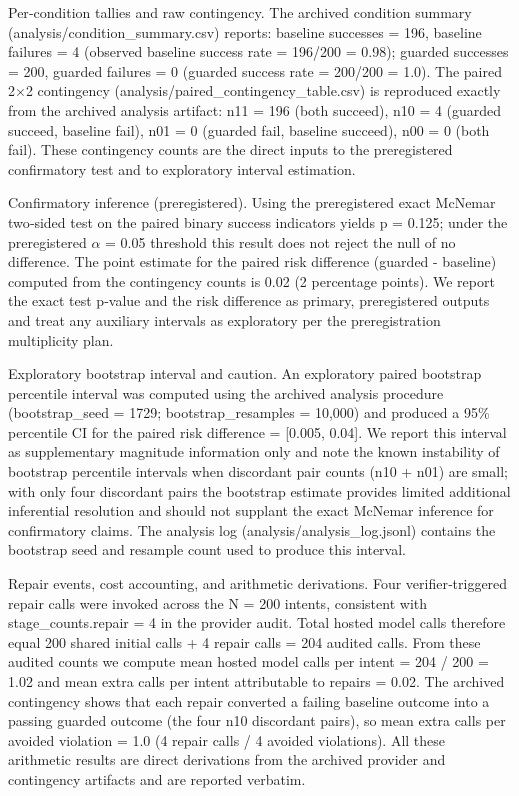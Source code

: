 \documentclass[conference]{IEEEtran}
\begin{document}
Per‑condition tallies and raw contingency. The archived condition summary (analysis/condition\_summary.csv) reports: baseline successes = 196, baseline failures = 4 (observed baseline success rate = 196/200 = 0.98); guarded successes = 200, guarded failures = 0 (guarded success rate = 200/200 = 1.0). The paired 2\ensuremath{\times}2 contingency (analysis/paired\_contingency\_table.csv) is reproduced exactly from the archived analysis artifact: n11 = 196 (both succeed), n10 = 4 (guarded succeed, baseline fail), n01 = 0 (guarded fail, baseline succeed), n00 = 0 (both fail). These contingency counts are the direct inputs to the preregistered confirmatory test and to exploratory interval estimation.

Confirmatory inference (preregistered). Using the preregistered exact McNemar two‑sided test on the paired binary success indicators yields p = 0.125; under the preregistered \ensuremath{\alpha} = 0.05 threshold this result does not reject the null of no difference. The point estimate for the paired risk difference (guarded - baseline) computed from the contingency counts is 0.02 (2 percentage points). We report the exact test p‑value and the risk difference as primary, preregistered outputs and treat any auxiliary intervals as exploratory per the preregistration multiplicity plan.

Exploratory bootstrap interval and caution. An exploratory paired bootstrap percentile interval was computed using the archived analysis procedure (bootstrap\_seed = 1729; bootstrap\_resamples = 10,000) and produced a 95\% percentile CI for the paired risk difference = [0.005, 0.04]. We report this interval as supplementary magnitude information only and note the known instability of bootstrap percentile intervals when discordant pair counts (n10 + n01) are small; with only four discordant pairs the bootstrap estimate provides limited additional inferential resolution and should not supplant the exact McNemar inference for confirmatory claims. The analysis log (analysis/analysis\_log.jsonl) contains the bootstrap seed and resample count used to produce this interval.

Repair events, cost accounting, and arithmetic derivations. Four verifier‑triggered repair calls were invoked across the N = 200 intents, consistent with stage\_counts.repair = 4 in the provider audit. Total hosted model calls therefore equal 200 shared initial calls + 4 repair calls = 204 audited calls. From these audited counts we compute mean hosted model calls per intent = 204 / 200 = 1.02 and mean extra calls per intent attributable to repairs = 0.02. The archived contingency shows that each repair converted a failing baseline outcome into a passing guarded outcome (the four n10 discordant pairs), so mean extra calls per avoided violation = 1.0 (4 repair calls / 4 avoided violations). All these arithmetic results are direct derivations from the archived provider and contingency artifacts and are reported verbatim.
\end{document}

